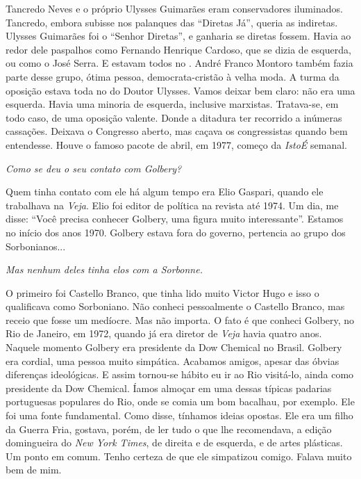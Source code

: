 \normalfont
Tancredo Neves e o próprio Ulysses Guimarães eram
conservadores iluminados. Tancredo, embora subisse nos palanques das
``Diretas Já'', queria as indiretas. Ulysses Guimarães foi o ``Senhor
Diretas'', e ganharia se diretas fossem. Havia ao redor dele paspalhos
como Fernando Henrique Cardoso, que se dizia de esquerda, ou como o José
Serra. E estavam todos no . André Franco Montoro também fazia parte
desse grupo, ótima pessoa, democrata-cristão à velha moda. A turma da
oposição estava toda no  do Doutor Ulysses. Vamos deixar bem claro:
não era uma esquerda. Havia uma minoria de esquerda, inclusive
marxistas. Tratava-se, em todo caso, de uma oposição valente. Donde a
ditadura ter recorrido a inúmeras cassações. Deixava o Congresso aberto,
mas caçava os congressistas quando bem entendesse. Houve o famoso pacote
de abril, em 1977, começo da \emph{IstoÉ} semanal.

\itshape
 Como se deu o seu contato com Golbery?

\normalfont
Quem tinha contato com ele há algum tempo era Elio
Gaspari, quando ele trabalhava na \emph{Veja}. Elio foi editor de
política na revista até 1974. Um dia, me disse: ``Você precisa conhecer
Golbery, uma figura muito interessante''. Estamos no início dos anos
1970. Golbery estava fora do governo, pertencia ao grupo dos
Sorbonianos...

\itshape
 Mas nenhum deles tinha elos com a Sorbonne.

\normalfont
O primeiro foi Castello Branco, que tinha lido muito
Victor Hugo e isso o qualificava como Sorboniano. Não conheci
pessoalmente o Castello Branco, mas receio que fosse um medíocre. Mas
não importa. O fato é que conheci Golbery, no Rio de Janeiro, em 1972,
quando já era diretor de \emph{Veja} havia quatro anos. Naquele momento
Golbery era presidente da Dow Chemical no Brasil. Golbery era cordial,
uma pessoa muito simpática. Acabamos amigos, apesar das óbvias
diferenças ideológicas. E assim tornou-se hábito eu ir ao Rio visitá-lo,
ainda como presidente da Dow Chemical. Íamos almoçar em uma dessas
típicas padarias portuguesas populares do Rio, onde se comia um bom
bacalhau, por exemplo. Ele foi uma fonte fundamental. Como disse,
tínhamos ideias opostas. Ele era um filho da Guerra Fria, gostava,
porém, de ler tudo o que lhe recomendava, a edição domingueira do
\emph{New York Times}, de direita e de esquerda, e de artes plásticas.
Um ponto em comum. Tenho certeza de que ele simpatizou comigo. Falava
muito bem de mim.

